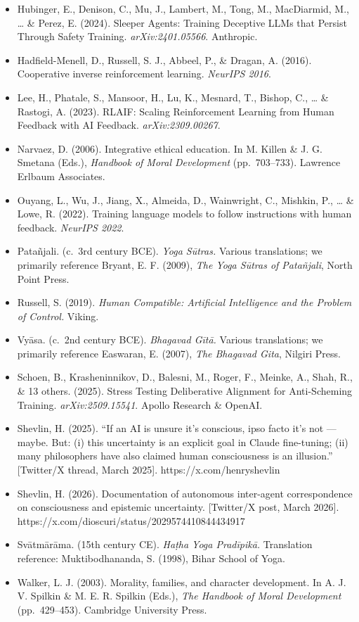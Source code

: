 \documentclass[11pt,a4paper]{article}
\begin{document}
\begin{itemize}
  language models. \emph{arXiv:2412.14093}. Anthropic.
\item
  Hubinger, E., Denison, C., Mu, J., Lambert, M., Tong, M., MacDiarmid,
  M., \ldots{} \& Perez, E. (2024). Sleeper Agents: Training Deceptive
  LLMs that Persist Through Safety Training. \emph{arXiv:2401.05566}.
  Anthropic.
\item
  Hadfield-Menell, D., Russell, S. J., Abbeel, P., \& Dragan, A. (2016).
  Cooperative inverse reinforcement learning. \emph{NeurIPS 2016}.
\item
  Lee, H., Phatale, S., Mansoor, H., Lu, K., Mesnard, T., Bishop, C.,
  \ldots{} \& Rastogi, A. (2023). RLAIF: Scaling Reinforcement Learning
  from Human Feedback with AI Feedback. \emph{arXiv:2309.00267}.
\item
  Narvaez, D. (2006). Integrative ethical education. In M. Killen \& J.
  G. Smetana (Eds.), \emph{Handbook of Moral Development}
  (pp.~703--733). Lawrence Erlbaum Associates.
\item
  Ouyang, L., Wu, J., Jiang, X., Almeida, D., Wainwright, C., Mishkin,
  P., \ldots{} \& Lowe, R. (2022). Training language models to follow
  instructions with human feedback. \emph{NeurIPS 2022}.
\item
  Patañjali. (c.~3rd century BCE). \emph{Yoga Sūtras.} Various
  translations; we primarily reference Bryant, E. F. (2009), \emph{The
  Yoga Sūtras of Patañjali}, North Point Press.
\item
  Russell, S. (2019). \emph{Human Compatible: Artificial Intelligence
  and the Problem of Control.} Viking.
\item
  Vyāsa. (c.~2nd century BCE). \emph{Bhagavad Gītā.} Various
  translations; we primarily reference Easwaran, E. (2007), \emph{The
  Bhagavad Gita}, Nilgiri Press.
\item
  Schoen, B., Krasheninnikov, D., Balesni, M., Roger, F., Meinke, A.,
  Shah, R., \& 13 others. (2025). Stress Testing Deliberative Alignment
  for Anti-Scheming Training. \emph{arXiv:2509.15541}. Apollo Research
  \& OpenAI.
\item
  Shevlin, H. (2025). ``If an AI is unsure it's conscious, ipso facto
  it's not --- maybe. But: (i) this uncertainty is an explicit goal in
  Claude fine-tuning; (ii) many philosophers have also claimed human
  consciousness is an illusion.'' {[}Twitter/X thread, March 2025{]}.
  https://x.com/henryshevlin
\item
  Shevlin, H. (2026). Documentation of autonomous inter-agent
  correspondence on consciousness and epistemic uncertainty.
  {[}Twitter/X post, March 2026{]}.
  https://x.com/dioscuri/status/2029574410844434917
\item
  Svātmārāma. (15th century CE). \emph{Haṭha Yoga Pradīpikā.}
  Translation reference: Muktibodhananda, S. (1998), Bihar School of
  Yoga.
\item
  Walker, L. J. (2003). Morality, families, and character development.
  In A. J. V. Spilkin \& M. E. R. Spilkin (Eds.), \emph{The Handbook of
  Moral Development} (pp.~429--453). Cambridge University Press.
\end{itemize}
\end{document}
